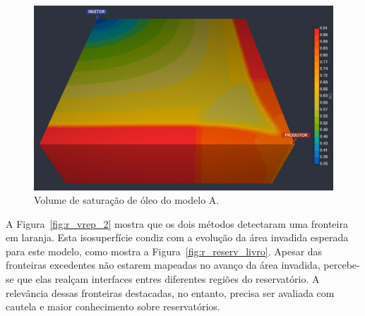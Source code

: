 \begin{figure}[h]
	\centering
	\includegraphics[width=1\textwidth]{images/r_vrep_so_2_slice}
	\caption{Volume de saturação de óleo do modelo A.}
	\label{fig:r_vrep_2_slice}
\end{figure}

	A Figura~\ref{fig:r_vrep_2} mostra que os dois métodos detectaram uma fronteira em laranja. Esta isosuperfície condiz com a evolução da área invadida esperada para este modelo, como mostra a Figura~\ref{fig:r_reserv_livro}. Apesar das fronteiras excedentes não estarem mapeadas no avanço da área invadida, percebe-se que elas realçam interfaces entres diferentes regiões do reservatório. A relevância dessas fronteiras destacadas, no entanto, precisa ser avaliada com cautela e maior conhecimento sobre reservatórios.

